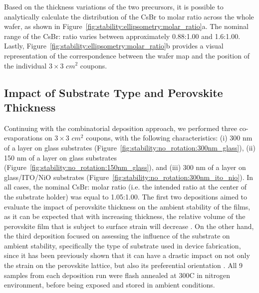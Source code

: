 Based on the thickness variations of the two precursors, it is possible to analytically calculate the distribution of the CsBr to  molar ratio across the whole wafer, as shown in Figure~\ref{fig:stability:ellipsometry:molar_ratio}a. The nominal range of the CsBr: ratio varies between approximately 0.88:1.00 and 1.6:1.00. Lastly, Figure~\ref{fig:stability:ellipsometry:molar_ratio}b provides a visual representation of the correspondence between the wafer map and the position of the individual $3\times3$ $cm^2$ coupons.
 

\subsection{Impact of Substrate Type and Perovskite Thickness}

Continuing with the combinatorial deposition approach, we performed three co-evaporations on $3\times3$ $cm^2$ coupons, with the following characteristics: (i) 300 nm of a  layer on glass substrates (Figure~\ref{fig:stability:no_rotation:300nm_glass}), (ii) 150 nm of a  layer on glass substrates (Figure~\ref{fig:stability:no_rotation:150nm_glass}), and (iii) 300 nm of a  layer on glass/ITO/NiO substrates (Figure~\ref{fig:stability:no_rotation:300nm_ito_nio}). In all cases, the nominal CsBr: molar ratio (i.e. the intended ratio at the center of the substrate holder) was equal to 1.05:1.00. The first two depositions aimed to evaluate the impact of perovskite thickness on the ambient stability of the films, as it can be expected that with increasing thickness, the relative volume of the perovskite film that is subject to surface strain will decrease \cite{Steele2019ThermalFilms}. On the other hand, the third deposition focused on assessing the influence of the substrate on ambient stability, specifically the type of substrate used in device fabrication, since it has been previously shown that it can have a drastic impact on not only the strain on the perovskite lattice, but also its preferential orientation \cite{Abzieher2021FromCells, Xue2020RegulatingLayers}. All 9 samples from each deposition run were flash annealed at 300\degree C in nitrogen environment, before being exposed and stored in ambient conditions. 


